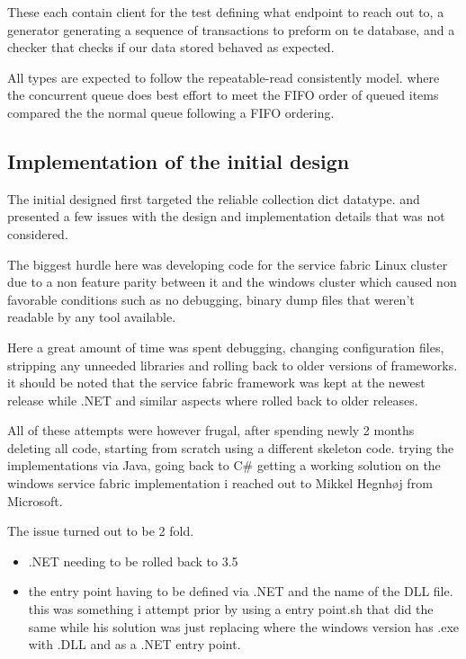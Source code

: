 \documentclass[a4paper,10pt,titlepage]{report}
\begin{document}
    These each contain client for the test defining what endpoint to reach out to, a generator generating a sequence of transactions to preform on te database, and a checker that checks if our data stored behaved as expected.

    All types are expected to follow the repeatable-read consistently model. where the concurrent queue does best effort to meet the FIFO order of queued items compared the the normal queue following a FIFO ordering.

    \subsection{Implementation of the initial design}

    The initial designed first targeted the reliable collection dict datatype. and presented a few issues with the design and implementation details that was not considered.

    The biggest hurdle here was developing code for the service fabric Linux cluster due to a non feature parity between it and the windows cluster which caused non favorable conditions such as no debugging, binary dump files that weren't readable by any tool available.

    Here a great amount of time was spent debugging, changing configuration files, stripping any unneeded libraries and rolling back to older versions of frameworks. it should be noted that the service fabric framework was kept at the newest release while .NET and similar aspects where rolled back to older releases.

    All of these attempts were however frugal, after spending newly 2 months deleting all code, starting from scratch using a different skeleton code. trying the implementations via Java, going back to C\# getting a working solution on the windows service fabric implementation i reached out to Mikkel Hegnhøj from Microsoft.

    The issue turned out to be 2 fold.
    \begin{itemize}
        \item .NET needing to be rolled back to 3.5
        \item the entry point having to be defined via .NET and the name of the DLL file. this was something i attempt prior by using a entry point.sh that did the same while his solution was just replacing where the windows version has .exe with .DLL and as a .NET entry point.
    \end{itemize}
\end{document}
